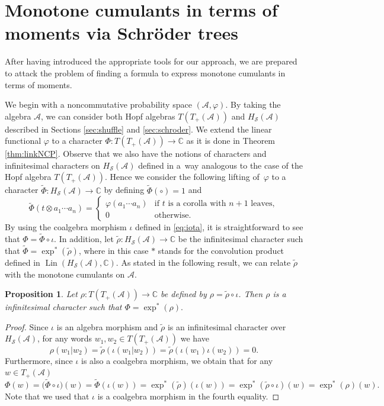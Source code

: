 \documentclass[pdftex]{sigma}%
\numberwithin{equation}{section}
\newtheorem{Proposition}[Theorem]{Proposition}
 { \theoremstyle{definition}
\newtheorem{Definition}[Theorem]{Definition}
\newtheorem{Example}[Theorem]{Example}
\newtheorem{Remark}[Theorem]{Remark} }
\newcommand{\A}{\mathcal{A}}
\newcommand{\cHS}{H_\mathcal{S}}
\begin{document}
\section{Monotone cumulants in terms of moments via Schr\"oder trees}\label{sec:monotone}

After having introduced the appropriate tools for our approach, we are prepared to attack the problem of finding a formula to express monotone cumulants in terms of moments.

 We begin with a noncommutative probability space $(\A,\varphi)$. By taking the algebra $\A$, we can consider both Hopf algebras $T(T_+(\A))$ and $\cHS(\A)$ described in Sections \ref{sec:shuffle} and \ref{sec:schroder}. We extend the linear functional $\varphi$ to a character $\Phi\colon T(T_+(\A))\to\mathbb{C}$ as it is done in Theorem \ref{thm:linkNCP}. Observe that we also have the notions of characters and infinitesimal characters on $\cHS(\A)$ defined in a~way analogous to the case of the Hopf algebra $T(T_+(\A))$. Hence we consider the following lifting of~$\varphi$ to a character $\tilde\Phi\colon \cHS(\A)\to\mathbb{C}$ by defining $\tilde\Phi(\circ) =1$ and
\begin{equation}
\label{eq:tildephi}
	\tilde\Phi(t \otimes a_1\cdots a_n)
	= \begin{cases} \varphi(a_1\cdots a_n) & \text{if $t$ is a corolla with $n+1$ leaves},\\ 0& \text{otherwise}. \end{cases}
\end{equation}
By using the coalgebra morphism $\iota$ defined in \eqref{eq:iota}, it is straightforward to see that $\Phi = \tilde\Phi \circ \iota.$ In addition, let $\tilde \rho\colon \cHS(\A)\to\mathbb{C}$ be the infinitesimal character such that $\tilde\Phi = \exp^*(\tilde\rho)$, where in this case $*$ stands for the convolution product defined in $\operatorname{Lin}(\cHS(\A),\mathbb{C})$. As stated in the following result, we can relate $\tilde\rho$ with the monotone cumulants on $\A$.

\begin{Proposition}\label{prop:easy}
Let $\rho\colon T(T_+(\A))\to\mathbb{C}$ be defined by $\rho = \tilde\rho\circ\iota$. Then $\rho$ is a infinitesimal character such that $\Phi = \exp^*(\rho).$
\end{Proposition}

\begin{proof}Since $\iota$ is an algebra morphism and $\tilde\rho$ is an infinitesimal character over $\cHS(\A)$, for any words $w_1,w_2\in T(T_+(\A))$ we have
\[
	\rho(w_1|w_2) = \tilde\rho(\iota(w_1|w_2)) = \tilde\rho(\iota(w_1)\iota(w_2)) = 0.
\]
Furthermore, since $\iota$ is also a coalgebra morphism, we obtain that for any $w\in T_+(\A)$
\[
	\Phi(w) = \big(\tilde\Phi \circ\iota\big)(w)
	= \tilde\Phi(\iota(w))
	= \exp^*(\tilde \rho)(\iota(w)) = \exp^*(\tilde\rho\circ\iota)(w)
	= \exp^*(\rho)(w).
\]
Note that we used that $\iota$ is a coalgebra morphism in the fourth equality.
\end{proof}
\end{document}

